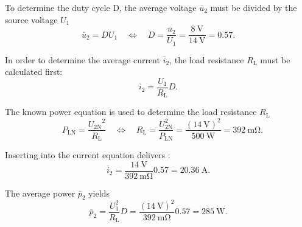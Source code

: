 \begin {solutionblock}
To determine the duty cycle D, the average voltage $\overline u_2$  must be divided by the source voltage $U_1$
\begin{equation}
    \overline u_2 = D U_1 \quad \Leftrightarrow \quad D = \frac{\overline u_2}{U_1} = \frac{\SI{8}{\volt}}{\SI{14}{\volt}}=0.57.
\end{equation}
    
In order to determine the average current $\overline i_2$, the load resistance $R_{\mathrm{L}}$ must be calculated first:
\begin{equation}
   \overline i_2 = \frac{U_1}{ R_{\mathrm{L}}}  D.
\end{equation}

The known power equation is used to determine the load resistance $R_{\mathrm{L}}$
\begin{equation}
   \quad  P_{\mathrm{LN}} = \frac{{ U_{\mathrm{2N}}}^2}{ R_{\mathrm{L}}} \quad
 \Leftrightarrow \quad R_{\mathrm{L}} = \frac{ U_{\mathrm{2N}}^2}{ P_{\mathrm{LN}}} = \frac{(\SI{14}{\volt})^2}{\SI{500}{\watt}} = \SI{392}{\milli\ohm}.
\end{equation}

Inserting into the current equation delivers :
 $$\overline i_2 = \frac{\SI{14}{\volt}}{\SI{392}{\milli\ohm}} 0.57 =  \SI{20.36}{\ampere}.$$
 
The average power $\overline{p}_{\mathrm{2}}$ yields
 \begin{equation}
 \overline{p}_{\mathrm{2}} = \frac{U_1^2}{ R_{\mathrm{L}}}  D = \frac{(\SI{14}{\volt})^2}{\SI{392}{\milli\ohm}}  0.57 = \SI{285}{\watt}.
\end{equation}
\end{solutionblock}
	
